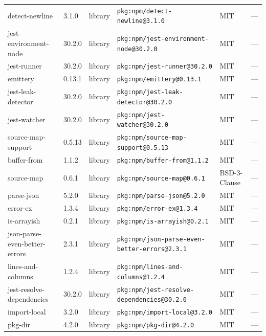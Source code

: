 \documentclass[11pt,a4paper]{article}
\begin{document}
\begin{longtable}{|p{4cm}|p{2cm}|p{1.6cm}|p{5cm}|p{1.5cm}|p{3.5cm}|}
\raggedright detect-newline & 3.1.0 & library & \small\texttt{pkg:npm/detect-newline@3.1.0} & MIT & \small — \\
\raggedright jest-environment-node & 30.2.0 & library & \small\texttt{pkg:npm/jest-environment-node@30.2.0} & MIT & \small — \\
\raggedright jest-runner & 30.2.0 & library & \small\texttt{pkg:npm/jest-runner@30.2.0} & MIT & \small — \\
\raggedright emittery & 0.13.1 & library & \small\texttt{pkg:npm/emittery@0.13.1} & MIT & \small — \\
\raggedright jest-leak-detector & 30.2.0 & library & \small\texttt{pkg:npm/jest-leak-detector@30.2.0} & MIT & \small — \\
\raggedright jest-watcher & 30.2.0 & library & \small\texttt{pkg:npm/jest-watcher@30.2.0} & MIT & \small — \\
\raggedright source-map-support & 0.5.13 & library & \small\texttt{pkg:npm/source-map-support@0.5.13} & MIT & \small — \\
\raggedright buffer-from & 1.1.2 & library & \small\texttt{pkg:npm/buffer-from@1.1.2} & MIT & \small — \\
\raggedright source-map & 0.6.1 & library & \small\texttt{pkg:npm/source-map@0.6.1} & BSD-3-Clause & \small — \\
\raggedright parse-json & 5.2.0 & library & \small\texttt{pkg:npm/parse-json@5.2.0} & MIT & \small — \\
\raggedright error-ex & 1.3.4 & library & \small\texttt{pkg:npm/error-ex@1.3.4} & MIT & \small — \\
\raggedright is-arrayish & 0.2.1 & library & \small\texttt{pkg:npm/is-arrayish@0.2.1} & MIT & \small — \\
\raggedright json-parse-even-better-errors & 2.3.1 & library & \small\texttt{pkg:npm/json-parse-even-better-errors@2.3.1} & MIT & \small — \\
\raggedright lines-and-columns & 1.2.4 & library & \small\texttt{pkg:npm/lines-and-columns@1.2.4} & MIT & \small — \\
\raggedright jest-resolve-dependencies & 30.2.0 & library & \small\texttt{pkg:npm/jest-resolve-dependencies@30.2.0} & MIT & \small — \\
\raggedright import-local & 3.2.0 & library & \small\texttt{pkg:npm/import-local@3.2.0} & MIT & \small — \\
\raggedright pkg-dir & 4.2.0 & library & \small\texttt{pkg:npm/pkg-dir@4.2.0} & MIT & \small — \\

\end{longtable}
\end{document}
